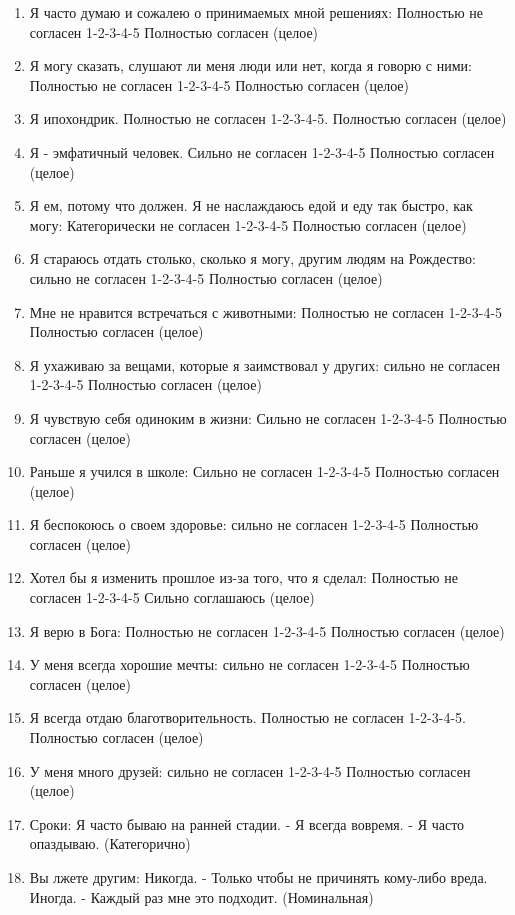 \documentclass[11pt]{article}
\begin{document}
\begin{enumerate}
\item Я часто думаю и сожалею о принимаемых мной решениях: Полностью не согласен 1-2-3-4-5 Полностью согласен (целое)
\item Я могу сказать, слушают ли меня люди или нет, когда я говорю с ними: Полностью не согласен 1-2-3-4-5 Полностью согласен (целое)
\item Я ипохондрик. Полностью не согласен 1-2-3-4-5. Полностью согласен (целое)
\item Я - эмфатичный человек. Сильно не согласен 1-2-3-4-5 Полностью согласен (целое)
\item Я ем, потому что должен. Я не наслаждаюсь едой и еду так быстро, как могу: Категорически не согласен 1-2-3-4-5 Полностью согласен (целое)
\item Я стараюсь отдать столько, сколько я могу, другим людям на Рождество: сильно не согласен 1-2-3-4-5 Полностью согласен (целое)
\item Мне не нравится встречаться с животными: Полностью не согласен 1-2-3-4-5 Полностью согласен (целое)
\item Я ухаживаю за вещами, которые я заимствовал у других: сильно не согласен 1-2-3-4-5 Полностью согласен (целое)
\item Я чувствую себя одиноким в жизни: Сильно не согласен 1-2-3-4-5 Полностью согласен (целое)
\item Раньше я учился в школе: Сильно не согласен 1-2-3-4-5 Полностью согласен (целое)
\item Я беспокоюсь о своем здоровье: сильно не согласен 1-2-3-4-5 Полностью согласен (целое)
\item Хотел бы я изменить прошлое из-за того, что я сделал: Полностью не согласен 1-2-3-4-5 Сильно соглашаюсь (целое)
\item Я верю в Бога: Полностью не согласен 1-2-3-4-5 Полностью согласен (целое)
\item У меня всегда хорошие мечты: сильно не согласен 1-2-3-4-5 Полностью согласен (целое)
\item Я всегда отдаю благотворительность. Полностью не согласен 1-2-3-4-5. Полностью согласен (целое)
\item У меня много друзей: сильно не согласен 1-2-3-4-5 Полностью согласен (целое)
\item Сроки: Я часто бываю на ранней стадии. - Я всегда вовремя. - Я часто опаздываю. (Категорично)
\item Вы лжете другим: Никогда. - Только чтобы не причинять кому-либо вреда. Иногда. - Каждый раз мне это подходит. (Номинальная)

\end{enumerate}
\end{document}
